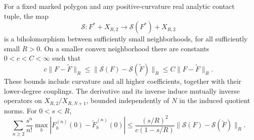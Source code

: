 \begin{theorem}
\label{thm:v65-analytic-inverse}
For a fixed marked polygon and any positive-curvature real analytic
contact tuple, the map
\[
 \mathcal S:F^*+X_{R,2}\longrightarrow\mathcal S(F^*)+X_{R,2}
\]
is a biholomorphism between sufficiently small neighborhoods, for all
sufficiently small $R>0$.  On a smaller convex neighborhood there are
constants $0<c<C<\infty$ such that
\begin{equation}\label{eq:v65-bilip}
 c\|F-\widetilde F\|_R
 \le\|\mathcal S(F)-\mathcal S(\widetilde F)\|_R
 \le C\|F-\widetilde F\|_R.
\end{equation}
These bounds include curvature and all higher coefficients, together
with their lower-degree couplings.  The derivative and its inverse
induce mutually inverse operators on
$X_{R,2}/X_{R,N+1}$, bounded independently of $N$ in the induced
quotient norms.  For $0<s<R$,
\begin{equation}\label{eq:v65-coefficient-bound}
 \sum_{n\ge2}\frac{s^n}{n!}
     \max_b|F_b^{(n)}(0)-\widetilde F_b^{(n)}(0)|
 \le\frac{(s/R)^2}{c(1-s/R)}
                \|\mathcal S(F)-\mathcal S(\widetilde F)\|_R.
\end{equation}
\end{theorem}
